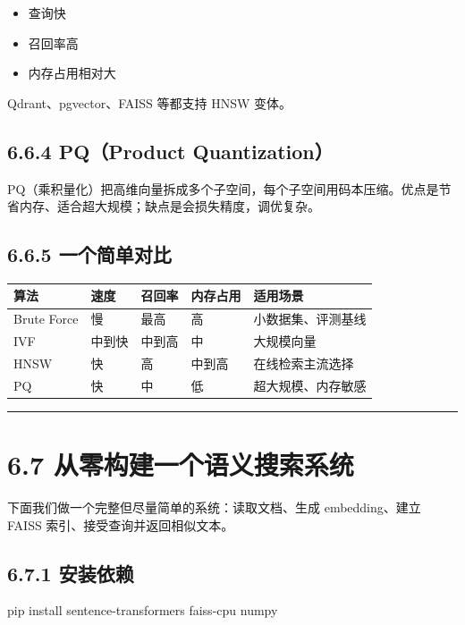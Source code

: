 \begin{itemize}[leftmargin=2em]
\item 查询快
\item 召回率高
\item 内存占用相对大
\end{itemize}

Qdrant、pgvector、FAISS 等都支持 HNSW 变体。


\subsection{6.6.4 PQ（Product Quantization）}

PQ（乘积量化）把高维向量拆成多个子空间，每个子空间用码本压缩。优点是节省内存、适合超大规模；缺点是会损失精度，调优复杂。


\subsection{6.6.5 一个简单对比}

\begingroup
\scriptsize
\setlength{\tabcolsep}{3pt}
\begin{longtable}{|p{}|p{}|p{}|p{}|p{}|}
\hline
算法 & 速度 & 召回率 & 内存占用 & 适用场景 \\ \hline
Brute Force & 慢 & 最高 & 高 & 小数据集、评测基线 \\ \hline
IVF & 中到快 & 中到高 & 中 & 大规模向量 \\ \hline
HNSW & 快 & 高 & 中到高 & 在线检索主流选择 \\ \hline
PQ & 快 & 中 & 低 & 超大规模、内存敏感 \\ \hline
\end{longtable}
\endgroup

\bigskip\hrule\bigskip

\section{6.7 从零构建一个语义搜索系统}

下面我们做一个完整但尽量简单的系统：读取文档、生成 embedding、建立 FAISS 索引、接受查询并返回相似文本。


\subsection{6.7.1 安装依赖}

\begin{codeblock}
pip install sentence-transformers faiss-cpu numpy
\end{codeblock}

